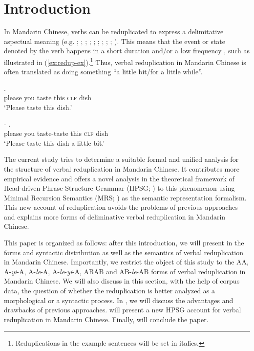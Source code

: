 \section{Introduction}\label{sec:intro}

In Mandarin Chinese, verbs can be reduplicated to express a delimitative aspectual meaning (e.g. \citealt[204--205]{Chao1968}; \citealt[232]{LiThompson1981};  \citealt[14]{Li1996}; \citealt[70]{Dai1997};  \citealt[382--383]{Zhu1998}; \citealt[420--421]{Xing2000}; \citealt[48]{Chen2001};  \citealt[288]{Tsao2001}; \citealt[11--12]{Yang2003}; \citealt[Sec.\,4.3]{XiaoMcEnery2004}). 
This means that the event or state denoted by the verb happens in a short duration and/or a low frequency \citep[155]{XiaoMcEnery2004}, such as illustrated in (\ref{ex:redup-ex}).\footnote{Reduplications
    in the example sentences will be set in italics.}
Thus, verbal reduplication in Mandarin Chinese is often translated as doing something ``a little bit/for a little while''.

\ea\label{ex:redup-ex} 
	\ea
	\gll {}     .\\
	please you taste this \textsc{clf} dish\\
	\glt `Please taste this dish.'
	
	\ex
	\gll {}  -   .\\
	please you taste-taste this \textsc{clf} dish\\
	\glt `Please taste this dish a little bit.' 
	\z
\z

The current study tries to determine a suitable formal and unified analysis for the structure of verbal reduplication in Mandarin Chinese.
It contributes more empirical evidence and 
offers a novel analysis in the theoretical framework of Head-driven Phrase Structure Grammar (HPSG; \citealt{PollardSag1994, Sag1997, HPSGHandbook}) to this phenomenon 
using Minimal Recursion Semantics (MRS; \citealt{Copestakeetal2005}) as the semantic representation formalism.
This new account of reduplication avoids the problems of previous approaches and
explains more forms of deliminative verbal reduplication in Mandarin Chinese.

This paper is organized as follows: 
after this introduction, we will present in  the forms and syntactic distribution as well as the semantics of verbal reduplication in Mandarin Chinese. 
Importantly, we restrict the object of this study to the AA, A-\textit{yi}-A, A-\textit{le}-A, A-\textit{le}-\textit{yi}-A, ABAB and AB-\textit{le}-AB forms of verbal reduplication in Mandarin Chinese.
We will also discuss in this section, with the help of corpus data, the question of whether the reduplication is better analyzed as a morphological or a syntactic process.
In , we will discuss the advantages and drawbacks of previous approaches. 
 will present a new {HPSG} account for verbal reduplication in Mandarin Chinese.
Finally,   will conclude the paper.

